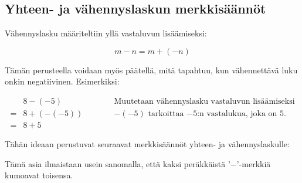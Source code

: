 
\subsection*{Yhteen- ja vähennyslaskun merkkisäännöt}

Vähennyslasku määriteltiin yllä vastaluvun lisäämiseksi:

\[m-n = m+(-n)\]

Tämän perusteella voidaan myös päätellä, mitä tapahtuu, kun vähennettävä luku onkin negatiivinen. Esimerkiksi:

\begin{align*}
&8-(-5)&\quad\quad\quad\textrm{Muutetaan vähennyslasku vastaluvun lisäämiseksi}\\
= &8+(-(-5))&\quad\quad\quad\textrm{$-(-5)$ tarkoittaa $-5$:n vastalukua, joka on 5.}\\
= &8+5
\end{align*}

Tähän ideaan perustuvat seuraavat merkkisäännöt yhteen- ja vähennyslaskulle:


Tämä asia ilmaistaan usein sanomalla, että kaksi peräkkäistä '$-$'-merkkiä kumoavat toisensa.



